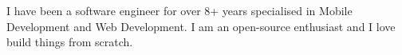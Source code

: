 \documentclass[9pt]{developercv} %
\begin{document}
\vspace{0.5cm}



\begin{minipage}[t]{0.4\textwidth} %
	\vspace{-\baselineskip} %
I have been a software engineer for over 8+ years specialised in  Mobile Development and Web Development. I am  an open-source enthusiast
and I love build things from scratch. 

\end{minipage}
\hfill %
\begin{minipage}[t]{0.5\textwidth} %
	\vspace{-\baselineskip} %
	\begin{barchart}{5.5}
	\end{barchart}
\end{minipage}


\end{document}
